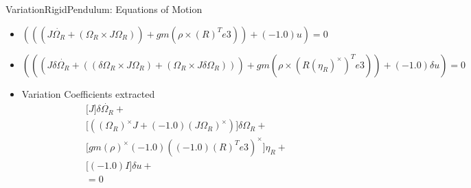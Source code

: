 VariationRigidPendulum: Equations of Motion
\begin{itemize}
\item $(((J \dot{\Omega_{R}}+(\Omega_{R}\times J \Omega_{R}))+gm(\rho\times {(R)}^{T} e3))+(-1.0)u)=0$
\item $(((J \delta \dot{\Omega_{R}}+((\delta \Omega_{R}\times J \Omega_{R})+(\Omega_{R}\times J \delta \Omega_{R})))+gm(\rho\times {(R {(\eta_{R})}^\times)}^{T} e3))+(-1.0)\delta u)=0$
\item Variation Coefficients extracted
\begin{gather}
\Big[J\Big]\delta \dot{\Omega_{R}}+\nonumber\\
\Big[({(\Omega_{R})}^\times J+(-1.0) {(J \Omega_{R})}^\times)\Big]\delta \Omega_{R}+\nonumber\\
\Big[g m {(\rho)}^\times (-1.0) {((-1.0){(R)}^{T} e3)}^\times\Big]\eta_{R}+\nonumber\\
\Big[(-1.0) I\Big]\delta u+\nonumber\\
=0
\end{gather}
\end{itemize}